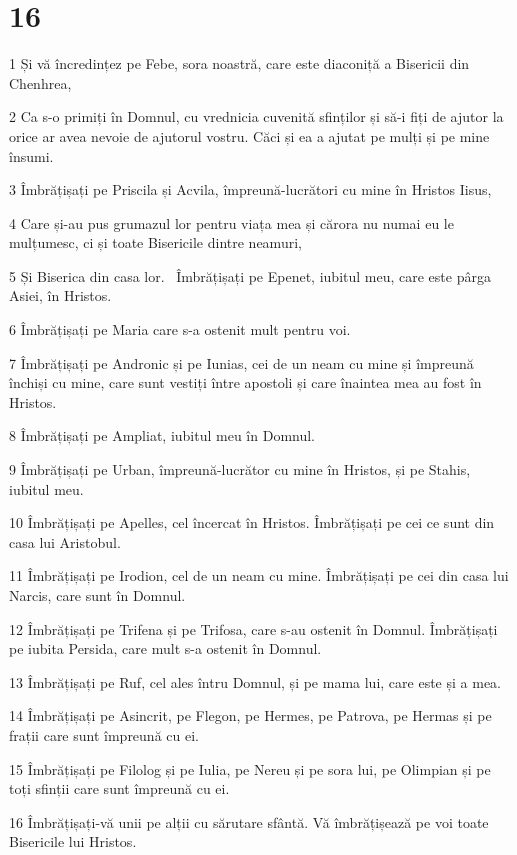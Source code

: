 \chapter{16}

\par 1 Și vă încredințez pe Febe, sora noastră, care este diaconiță a Bisericii din Chenhrea,
\par 2 Ca s-o primiți în Domnul, cu vrednicia cuvenită sfinților și să-i fiți de ajutor la orice ar avea nevoie de ajutorul vostru. Căci și ea a ajutat pe mulți și pe mine însumi.
\par 3 Îmbrățișați pe Priscila și Acvila, împreună-lucrători cu mine în Hristos Iisus,
\par 4 Care și-au pus grumazul lor pentru viața mea și cărora nu numai eu le mulțumesc, ci și toate Bisericile dintre neamuri,
\par 5 Și Biserica din casa lor.  Îmbrățișați pe Epenet, iubitul meu, care este pârga Asiei, în Hristos.
\par 6 Îmbrățișați pe Maria care s-a ostenit mult pentru voi.
\par 7 Îmbrățișați pe Andronic și pe Iunias, cei de un neam cu mine și împreună închiși cu mine, care sunt vestiți între apostoli și care înaintea mea au fost în Hristos.
\par 8 Îmbrățișați pe Ampliat, iubitul meu în Domnul.
\par 9 Îmbrățișați pe Urban, împreună-lucrător cu mine în Hristos, și pe Stahis, iubitul meu.
\par 10 Îmbrățișați pe Apelles, cel încercat în Hristos. Îmbrățișați pe cei ce sunt din casa lui Aristobul.
\par 11 Îmbrățișați pe Irodion, cel de un neam cu mine. Îmbrățișați pe cei din casa lui Narcis, care sunt în Domnul.
\par 12 Îmbrățișați pe Trifena și pe Trifosa, care s-au ostenit în Domnul. Îmbrățișați pe iubita Persida, care mult s-a ostenit în Domnul.
\par 13 Îmbrățișați pe Ruf, cel ales întru Domnul, și pe mama lui, care este și a mea.
\par 14 Îmbrățișați pe Asincrit, pe Flegon, pe Hermes, pe Patrova, pe Hermas și pe frații care sunt împreună cu ei.
\par 15 Îmbrățișați pe Filolog și pe Iulia, pe Nereu și pe sora lui, pe Olimpian și pe toți sfinții care sunt împreună cu ei.
\par 16 Îmbrățișați-vă unii pe alții cu sărutare sfântă. Vă îmbrățișează pe voi toate Bisericile lui Hristos.
